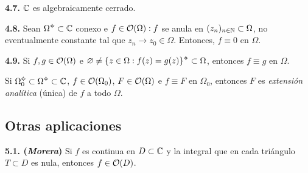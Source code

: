 \begin{corollary}
    \textbf{4.7.} \(\mathbb{C}\) es algebraicamente cerrado. 
\end{corollary}

\hypertarget{thm248}{}
\begin{theorem}
    \textbf{4.8.} Sean \(\Omega \ab \subset \C\) conexo e \(f\in \mathcal{O}(\Omega) : f \) se anula en \((z_n)_{n\in \mathbb{N}}\subset \Omega\), no eventualmente constante tal que \(z_n \to z_0 \in \Omega\). Entonces, \(f\equiv 0 \) en \(\Omega\).
\end{theorem}


\hypertarget{coro49}{}
\begin{corollary}
    \textbf{4.9.} Si \(f, g \in \mathcal{O}(\Omega)\) e \(\varnothing \neq \{z \in \Omega : f(z) = g(z)\}\ab \subset \Omega\), entonces \(f \equiv g \) en \(\Omega\). 
\end{corollary}

\begin{note}
    Si \(\Omega_0\ab \subset \Omega \ab \subset \C\), \(f \in \mathcal{O}(\Omega_0)\), \( F\in \mathcal{O}(\Omega) \) e \(f \equiv F\) en \(\Omega_0\), entonces \(F\) es \emph{extensión analítica} (única) de \(f\) a todo \(\Omega\). %
\end{note}

\subsection*{Otras aplicaciones}

\hypertarget{thm251}{}
\begin{theorem}
    \textbf{5.1. (\emph{Morera})} Si \(f \) es continua en \(D\subset \mathbb{C}\) y la integral que en cada triángulo \(T\subset D\) es nula, entonces \(f \in \mathcal{O}(D)\). 
\end{theorem}


